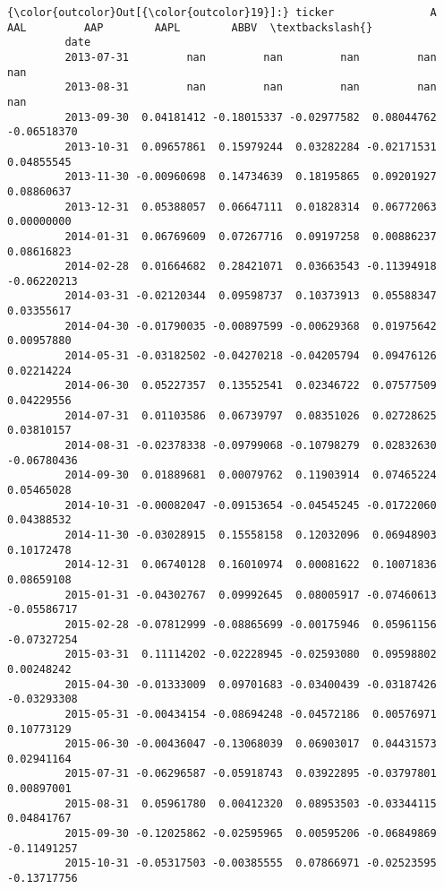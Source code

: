 \documentclass[11pt]{article}
\begin{document}
\begin{Verbatim}[commandchars=\\\{\}]
{\color{outcolor}Out[{\color{outcolor}19}]:} ticker               A         AAL         AAP        AAPL        ABBV  \textbackslash{}
         date                                                                     
         2013-07-31         nan         nan         nan         nan         nan   
         2013-08-31         nan         nan         nan         nan         nan   
         2013-09-30  0.04181412 -0.18015337 -0.02977582  0.08044762 -0.06518370   
         2013-10-31  0.09657861  0.15979244  0.03282284 -0.02171531  0.04855545   
         2013-11-30 -0.00960698  0.14734639  0.18195865  0.09201927  0.08860637   
         2013-12-31  0.05388057  0.06647111  0.01828314  0.06772063  0.00000000   
         2014-01-31  0.06769609  0.07267716  0.09197258  0.00886237  0.08616823   
         2014-02-28  0.01664682  0.28421071  0.03663543 -0.11394918 -0.06220213   
         2014-03-31 -0.02120344  0.09598737  0.10373913  0.05588347  0.03355617   
         2014-04-30 -0.01790035 -0.00897599 -0.00629368  0.01975642  0.00957880   
         2014-05-31 -0.03182502 -0.04270218 -0.04205794  0.09476126  0.02214224   
         2014-06-30  0.05227357  0.13552541  0.02346722  0.07577509  0.04229556   
         2014-07-31  0.01103586  0.06739797  0.08351026  0.02728625  0.03810157   
         2014-08-31 -0.02378338 -0.09799068 -0.10798279  0.02832630 -0.06780436   
         2014-09-30  0.01889681  0.00079762  0.11903914  0.07465224  0.05465028   
         2014-10-31 -0.00082047 -0.09153654 -0.04545245 -0.01722060  0.04388532   
         2014-11-30 -0.03028915  0.15558158  0.12032096  0.06948903  0.10172478   
         2014-12-31  0.06740128  0.16010974  0.00081622  0.10071836  0.08659108   
         2015-01-31 -0.04302767  0.09992645  0.08005917 -0.07460613 -0.05586717   
         2015-02-28 -0.07812999 -0.08865699 -0.00175946  0.05961156 -0.07327254   
         2015-03-31  0.11114202 -0.02228945 -0.02593080  0.09598802  0.00248242   
         2015-04-30 -0.01333009  0.09701683 -0.03400439 -0.03187426 -0.03293308   
         2015-05-31 -0.00434154 -0.08694248 -0.04572186  0.00576971  0.10773129   
         2015-06-30 -0.00436047 -0.13068039  0.06903017  0.04431573  0.02941164   
         2015-07-31 -0.06296587 -0.05918743  0.03922895 -0.03797801  0.00897001   
         2015-08-31  0.05961780  0.00412320  0.08953503 -0.03344115  0.04841767   
         2015-09-30 -0.12025862 -0.02595965  0.00595206 -0.06849869 -0.11491257   
         2015-10-31 -0.05317503 -0.00385555  0.07866971 -0.02523595 -0.13717756   

\end{Verbatim}
\end{document}
